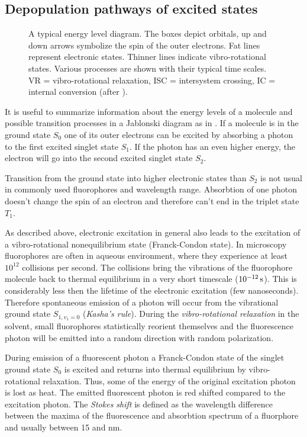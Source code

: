 \subsection{Depopulation pathways of excited states}
\begin{figure}[!hbt]
  \centering
  \def\svgscale{.8}
  
  \caption{A typical energy level diagram. The boxes depict orbitals,
    up and down arrows symbolize the spin of the outer electrons. Fat
    lines represent electronic states. Thinner lines indicate
    vibro-rotational states. Various processes are shown with their
    typical time scales. VR = vibro-rotational relaxation, ISC =
    intersystem crossing, IC = internal conversion (after
    \cite{Haken2006}).}
  \label{fig:flu-level}
\end{figure}
It is useful to summarize information about the energy levels of a
molecule and possible transition processes in a Jablonski diagram as
in . If a molecule is in the ground state $S_0$
one of its outer electrons can be excited by absorbing a photon to the
first excited singlet state $S_1$.  If the photon has an even higher
energy, the electron will go into the second excited singlet state
$S_2$.

Transition from the ground state into higher electronic states than
$S_2$ is not usual in commonly used fluorophores and wavelength range.
Absorbtion of one photon doesn't change the spin of an electron and
therefore can't end in the triplet state $T_1$.

As described above, electronic excitation in general also leads to the
excitation of a vibro-rotational nonequilibrium state (Franck-Condon
state). In microscopy fluorophores are often in aqueous environment,
where they experience at least $10^{12}$ collisions per second. The
collisions bring the vibrations of the fluorophore molecule back to
thermal equilibrium in a very short timescale
($\unit[10^{-12}]{s}$). This is considerably less then the lifetime of
the electronic excitation (few nanoseconds). Therefore spontaneous
emission of a photon will occur from the vibrational ground state
$S_{1,v_1=0}$ (\emph{Kasha's rule}). During the \emph{vibro-rotational
  relaxation} in the solvent, small fluorophores statistically
reorient themselves and the fluorescence photon will be emitted into a
random direction with random polarization.

During emission of a fluorescent photon a Franck-Condon state of the
singlet ground state $S_0$ is excited and returns into thermal
equilibrium by vibro-rotational relaxation. Thus, some of the energy
of the original excitation photon is lost as heat. The emitted
fluorescent photon is red shifted compared to the excitation
photon. The \emph{Stokes shift} is defined as the wavelength
difference between the maxima of the fluorescence and absorbtion
spectrum of a fluorphore and usually between 15 and \unit[30]{nm}.

